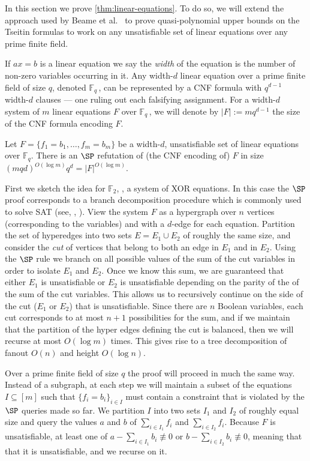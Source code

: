 In this section we prove \autoref{thm:linear-equations}. 
To do so, we will extend the approach used by Beame et al.~\cite{BeameFIKPPR18} to prove quasi-polynomial upper bounds on the Tseitin formulas to work on any unsatisfiable set of linear equations over any prime finite field. 

If $ax = b$ is a linear equation we say the \emph{width} of the equation is the number of non-zero variables occurring in it.
Any width-$d$ linear equation over a prime finite field of size $q$, denoted $\mathbb{F}_q\,$, can be represented by a CNF formula with $q^{d-1}$ width-$d$ clauses --- one ruling out each falsifying assignment.
For a width-$d$ system of $m$ linear equations $F$ over $\mathbb{F}_q\,$, we will denote by $|F| := mq^{d-1}$ the size of the CNF formula encoding $F$. 

\begin{theorem}\label{thm:SP_gaussian_elim}
	Let $F = \{f_1 = b_1, \ldots, f_m = b_m \}$ be a width-$d$, unsatisfiable set of linear equations over $\mathbb{F}_q$.
	There is an $\SP$ refutation of (the CNF encoding of) $F$ in size $(mqd)^{O(\log m)}q^d = |F|^{O(\log m)}$.
\end{theorem}

First we sketch the idea for $\mathbb{F}_2$, \ie,  a system of XOR equations.
In this case the $\SP$ proof corresponds to a branch decomposition procedure which is commonly used to solve SAT (see, \eg, \cite{LodhaOS19,AlekhnovichR02,Dechter96,Darwiche01}). 
View the system $F$ as a hypergraph over $n$ vertices (corresponding to the variables) and with a $d$-edge for each equation. 
Partition the set of hyperedges into two sets $E = E_1 \cup E_2$ of roughly the same size, and consider the \emph{cut} of vertices that belong to both an edge in $E_1$ and in $E_2$. 
Using the $\SP$ rule we branch on all possible values of the sum of the cut variables in order to isolate $E_1$ and $E_2$. 
Once we know this sum, we are guaranteed that either $E_1$ is unsatisfiable or $E_2$ is unsatisfiable depending on the parity of the of the sum of the cut variables. 
This allows us to recursively continue on the side of the cut ($E_1$ or $E_2$) that is unsatisfiable. 
Since there are $n$ Boolean variables, each cut corresponds to at most $n+1$ possibilities for the sum, and if we maintain that the partition of the hyper edges defining the cut is balanced, then we will recurse at most $O(\log m)$ times. 
This gives rise to a tree decomposition of fanout $O(n)$ and height $O(\log n)$.

Over a prime finite field of size $q$ the proof will proceed in much the same way. 
Instead of a subgraph, at each step we will maintain a subset of the equations $I \subseteq [m]$ such that $\{f_i =b_i \}_{i \in I}$ must contain a constraint that is violated by the $\SP$ queries made so far. We partition $I$ into two sets $I_1$ and $I_2$ of roughly equal size and query the values $a$ and $b$ of $\sum_{i \in I_1} f_i$ and $\sum_{i \in I_2} f_i$. Because $F$ is unsatisfiable, at least one of $a- \sum_{i \in I_1} b_i \not \equiv 0$ or $b- \sum_{i \in I_2} b_i \not \equiv 0$, meaning that that it is unsatisfiable, and we recurse on it. 



